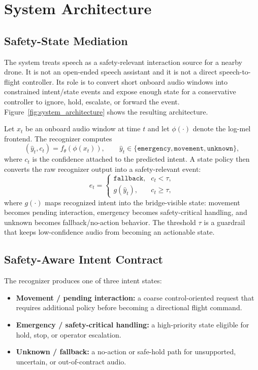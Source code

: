 \section{System Architecture}
\label{sec:system}



\subsection{Safety-State Mediation}

The system treats speech as a safety-relevant interaction source for a nearby drone. It is not an open-ended speech assistant and it is not a direct speech-to-flight controller. Its role is to convert short onboard audio windows into constrained intent/state events and expose enough state for a conservative controller to ignore, hold, escalate, or forward the event. Figure~\ref{fig:system_architecture} shows the resulting architecture.

Let $x_t$ be an onboard audio window at time $t$ and let $\phi(\cdot)$ denote the log-mel frontend. The recognizer computes
\[
(\hat{y}_t, c_t) = f_{\theta}(\phi(x_t)),
\qquad
\hat{y}_t \in \{\texttt{emergency}, \texttt{movement}, \texttt{unknown}\},
\]
where $c_t$ is the confidence attached to the predicted intent. A state policy then converts the raw recognizer output into a safety-relevant event:
\[
e_t =
\begin{cases}
\texttt{fallback}, & c_t < \tau,\\
g(\hat{y}_t), & c_t \geq \tau,
\end{cases}
\]
where $g(\cdot)$ maps recognized intent into the bridge-visible state: movement becomes pending interaction, emergency becomes safety-critical handling, and unknown becomes fallback/no-action behavior. The threshold $\tau$ is a guardrail that keeps low-confidence audio from becoming an actionable state.

\subsection{Safety-Aware Intent Contract}

The recognizer produces one of three intent states:
\begin{itemize}
\item \textbf{Movement / pending interaction:} a coarse control-oriented request that requires additional policy before becoming a directional flight command.
\item \textbf{Emergency / safety-critical handling:} a high-priority state eligible for hold, stop, or operator escalation.
\item \textbf{Unknown / fallback:} a no-action or safe-hold path for unsupported, uncertain, or out-of-contract audio.
\end{itemize}

